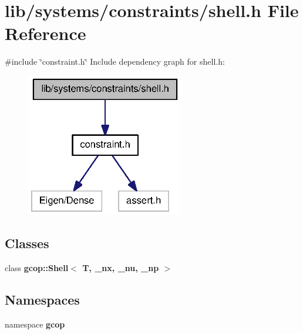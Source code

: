 \section{lib/systems/constraints/shell.h \-File \-Reference}
\label{shell_8h}
{\ttfamily \#include \char`\"{}constraint.\-h\char`\"{}}\*
\-Include dependency graph for shell.\-h\-:
\nopagebreak
\begin{figure}[H]
\begin{center}
\leavevmode
\includegraphics[width=194pt]{shell_8h__incl}
\end{center}
\end{figure}
\subsection*{\-Classes}
\begin{DoxyCompactItemize}
\item 
class {\bf gcop\-::\-Shell$<$ T, \-\_\-nx, \-\_\-nu, \-\_\-np $>$}
\end{DoxyCompactItemize}
\subsection*{\-Namespaces}
\begin{DoxyCompactItemize}
\item 
namespace {\bf gcop}
\end{DoxyCompactItemize}
